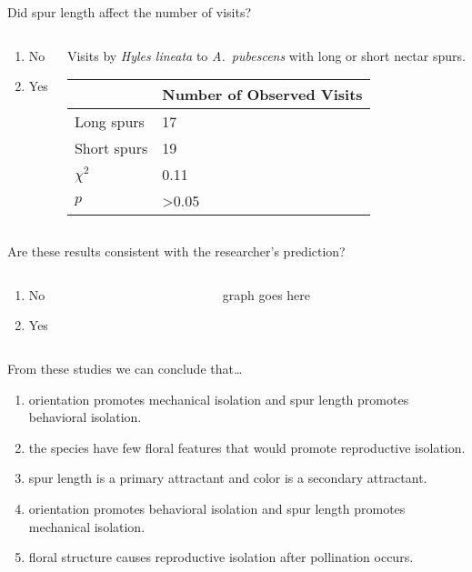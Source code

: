 \documentclass[t,hidelinks]{beamer}
\newcommand{\ques}[1]{\highlight{\textsc{q#1:}}}
\begin{document}
\begin{frame}[t]{\ques{12} Did spur length affect the number of visits?}
	
	\begin{columns}[t]
		\begin{column}{0.28\textwidth}
			\begin{enumerate}
				\item No
				\item Yes
			\end{enumerate}
		\end{column}
		\begin{column}{0.5\textwidth}
			Visits by \textit{Hyles lineata} to \textit{A.~pubescens} with long or short nectar spurs.
			
			\begin{tabular}{L{0.6in}R{1in}}
				\toprule
				& Number of Observed Visits \tabularnewline
				\midrule
				Long spurs		&	17	 \tabularnewline
				Short spurs		&	19	 \tabularnewline
				$\chi^2$		&	0.11 \tabularnewline
				$p$				&  \textgreater0.05 \tabularnewline
				\bottomrule
			\end{tabular}
		\end{column}
	\end{columns}
\end{frame}
%
\begin{frame}[t]{\ques{13} Are these results consistent with the researcher's prediction?}
		\begin{columns}[t]
		\begin{column}{0.28\textwidth}
			\begin{enumerate}
				\item No
				\item Yes
			\end{enumerate}
		\end{column}
		\begin{column}{0.5\textwidth}
			graph goes here			
		\end{column}
	\end{columns}
	
\end{frame}
%
\begin{frame}[t]{\ques{14} From these studies we can conclude that\dots}
	
	\begin{enumerate}
		\item orientation promotes mechanical isolation and spur length promotes behavioral isolation.
		\item the species have few floral features that would promote reproductive isolation.
		\item spur length is a primary attractant and color is a secondary attractant.
		\item orientation promotes behavioral isolation and spur length promotes mechanical isolation.
		\item floral structure causes reproductive isolation after pollination occurs.
	\end{enumerate}
\end{frame}
\end{document}
